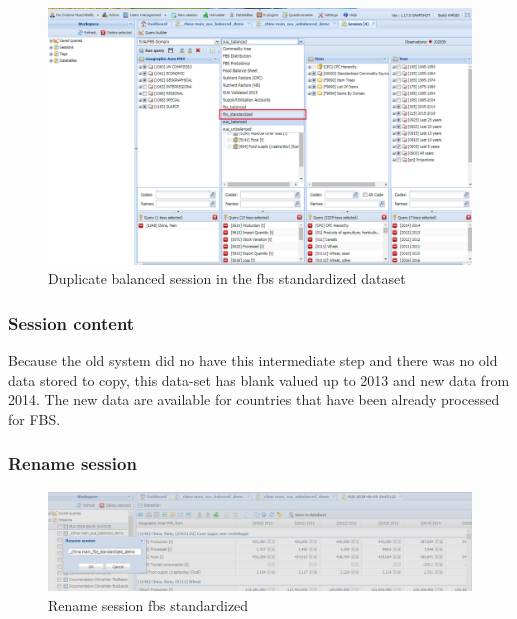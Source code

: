 \documentclass[]{article}
\begin{document}
\begin{figure}[H]

{\centering \includegraphics[width=1\linewidth]{images/standPlugin/21_duplicateBalanced} 

}

\caption{\label{fig:f21}Duplicate balanced session in the fbs standardized dataset}\label{fig:f21}
\end{figure}

\subsubsection{Session content}\label{session-content-1}

Because the old system did no have this intermediate step and there was
no old data stored to copy, this data-set has blank valued up to 2013
and new data from 2014. The new data are available for countries that
have been already processed for FBS.

\subsubsection{Rename session}\label{rename-session-2}

\begin{figure}[H]

{\centering \includegraphics[width=1\linewidth]{images/standPlugin/22_renameStand} 

}

\caption{\label{fig:f22}Rename session fbs standardized}\label{fig:f22}
\end{figure}
\end{document}
